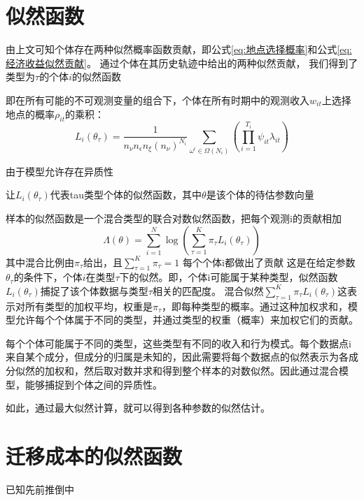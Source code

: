 \documentclass[
  a4paper,
  zihao=-4,
  fontset=mac,
  AutoFakeBold,
  AutoFakeSlant,
  oneside]{ctexbook}
\begin{document}
\section{似然函数}

由上文可知个体存在两种似然概率函数贡献，即公式\ref{eq:地点选择概率}和公式\ref{eq:经济收益似然贡献}。
通过个体在其历史轨迹中给出的两种似然贡献，
我们得到了类型为$\tau$的个体$i$的似然函数

即在所有可能的不可观测变量的组合下，个体在所有时期中的观测收入$w_{it}$上选择地点的概率$\rho_{it}$的乘积：
\begin{equation}
  L_{i}(\theta_{\tau})=\frac{1}{n_{\nu}n_{\epsilon}n_{\xi}(n_{\nu})^{N_{i}}} \sum\limits_{\omega^{i}\in\Omega(N_{i})}(\prod\limits_{i=1}^{T_{i}} \psi_{it}\lambda_{it})
\end{equation}

由于模型允许存在异质性

让$L_{i}(\theta_{\tau})$代表tau类型个体的似然函数，其中$\theta$是该个体的待估参数向量

样本的似然函数是一个混合类型的联合对数似然函数，把每个观测i的贡献相加
\begin{equation}
\Lambda(\theta)=\sum\limits_{i=1}^{N}\log(\sum\limits_{\tau=1}^{K}\pi_{\tau}L_{i}(\theta_{\tau})) 
\end{equation}
其中混合比例由$\pi_{\tau}$给出，且$\sum\limits_{\tau=1}^{K}\pi_{\tau}=1$
每个个体i都做出了贡献
这是在给定参数$\theta_{\tau}$的条件下，个体$i$在类型$\tau$下的似然。即，个体i可能属于某种类型，似然函数
$L_i(\theta_{\tau})$捕捉了该个体数据与类型$\tau$相关的匹配度。
混合似然$\sum_{\tau=1}^{K} \pi_{\tau} L_i(\theta_{\tau})$这表示对所有类型的加权平均，权重是$\pi_{\tau}$，即每种类型的概率。通过这种加权求和，模型允许每个个体属于不同的类型，并通过类型的权重（概率）来加权它们的贡献。

每个个体可能属于不同的类型，这些类型有不同的收入和行为模式。每个数据点i来自某个成分，但成分的归属是未知的，因此需要将每个数据点的似然表示为各成分似然的加权和，然后取对数并求和得到整个样本的对数似然。因此通过混合模型，能够捕捉到个体之间的异质性。


如此，通过最大似然计算，就可以得到各种参数的似然估计。

\section{迁移成本的似然函数}

已知先前推倒中


\end{document}
